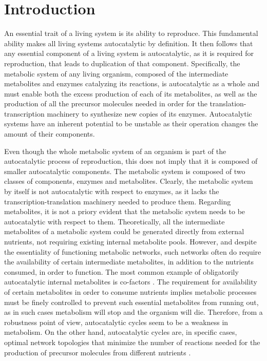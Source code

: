 \section{Introduction}
    An essential trait of a living system is its ability to reproduce.
    This fundamental ability makes all living systems autocatalytic by definition.
    It then follows that any essential component of a living system is autocatalytic, as it is required for reproduction, that leads to duplication of that component.
    Specifically, the metabolic system of any living organism, composed of the intermediate metabolites and enzymes catalyzing its reactions, is autocatalytic as a whole and must enable both the excess production of each of its metabolites, as well as the production of all the precursor molecules needed in order for the translation-transcription machinery to synthesize new copies of its enzymes.
    Autocatalytic systems have an inherent potential to be unstable as their operation changes the amount of their components.

    Even though the whole metabolic system of an organism is part of the autocatalytic process of reproduction, this does not imply that it is composed of smaller autocatalytic components.
    The metabolic system is composed of two classes of components, enzymes and metabolites.
    Clearly, the metabolic system by itself is not autocatalytic with respect to enzymes, as it lacks the transcription-translation machinery needed to produce them.
    Regarding metabolites, it is not a priory evident that the metabolic system needs to be autocatalytic with respect to them.
    Theoretically, all the intermediate metabolites of a metabolic system could be generated directly from external nutrients, not requiring existing internal metabolite pools.
    However, and despite the essentiality of functioning metabolic networks, such networks often do require the availability of certain intermediate metabolites, in addition to the nutrients consumed, in order to function.
    The most common example of obligatorily autocatalytic internal metabolites is co-factors \cite{Kun2008-xg}.
    The requirement for availability of certain metabolites in order to consume nutrients implies metabolic processes must be finely controlled to prevent such essential metabolites from running out, as in such cases metabolism will stop and the organism will die.
    Therefore, from a robustness point of view, autocatalytic cycles seem to be a weakness in metabolism.
    On the other hand, autocatalytic cycles are, in specific cases, optimal network topologies that minimize the number of reactions needed for the production of precursor molecules from different nutrients \cite{Riehl2010-yh}.

